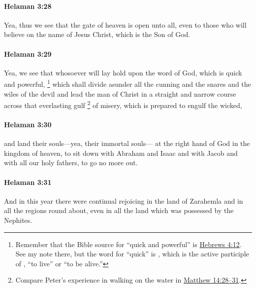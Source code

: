 		\paragraph{Helaman 3:28} %
			\label{HELAMAN-3-28}

			Yea, thus we see that the gate of heaven is open unto all,
			even to those who will believe on the name of Jesus Christ,
			which is the Son of God.

		\paragraph{Helaman 3:29} %
			\label{HELAMAN-3-29}

			Yea, we see that whosoever will lay hold upon the word of God,
			which is quick and powerful,%
				\footnote{%
					Remember that the Bible source for ``quick and powerful'' is \hyperref[HEBREWS-4-12]{Hebrews 4:12}. See my note there, but the word for ``quick'' is , which is the active participle of , ``to live'' or ``to be alive.''
					}
			which shall divide asunder
			all the cunning and the snares and the wiles of the devil
			and lead the man of Christ in a straight and narrow course
			across that everlasting gulf%
				\footnote{%
					Compare Peter's experience in walking on the water in \hyperref[MATTHEW-14-28]{Matthew 14:28--31}.
					} 
			of misery,
			which is prepared to engulf the wicked,

		\paragraph{Helaman 3:30} %
			\label{HELAMAN-3-30}

			and land their souls---yea, their immortal souls---
			at the right hand of God in the kingdom of heaven,
			to sit down with Abraham and Isaac and with Jacob
			and with all our holy fathers,
			to go no more out.

		\paragraph{Helaman 3:31} %
			\label{HELAMAN-3-31}

			And in this year there were continual rejoicing
			in the land of Zarahemla and in all the regions round about,
			even in all the land which was possessed by the Nephites.

